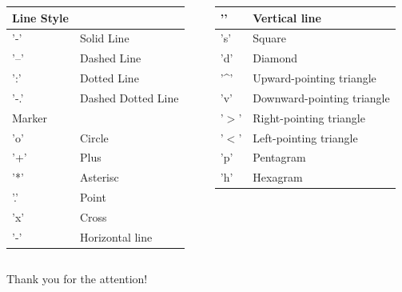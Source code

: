 \documentclass[xcolor={dvipsnames,rgb}, aspectratio=169]{beamer}
\begin{document}
\begin{frame}{}
   \begin{columns}[t]
      \begin{column}{0.5\textwidth}
         \begin{table}
         \centering
         \begin{tabular}{l|l} 
         \hline
         \multicolumn{1}{l}{Line Style} & \\
         \hline
         '-'    & Solid Line \\
         \hline
         '--'   & Dashed Line \\
         \hline
         ':'    & Dotted Line \\
         \hline
         '-.'   & Dashed Dotted Line \\
         \hline\hline
         \multicolumn{1}{l}{Marker} & \\
         \hline\hline
         'o'     & Circle \\
         \hline
         '+'     & Plus \\
         \hline
         '*'     & Asterisc \\
         \hline
         '.'     & Point \\
         \hline
         'x'     & Cross \\
         \hline
         '-'     & Horizontal line \\
         \hline
         \end{tabular}
         \end{table}
      \end{column}
      \begin{column}{0.5\textwidth}
         \begin{table}
         \centering
         \begin{tabular}{l|l} 
         \hline
         '\textbar{}' & Vertical line \\
         \hline
         's'  & Square \\
         \hline
         'd' & Diamond \\
         \hline
         '\^{}'    & Upward-pointing triangle \\
         \hline
         'v'       & Downward-pointing triangle \\
         \hline
         '$>$' & Right-pointing triangle \\
         \hline
         '$<$' & Left-pointing triangle \\
         \hline
         'p' & Pentagram \\
         \hline
         'h'  & Hexagram \\
         \hline
         \end{tabular}
         \end{table}
      \end{column}
   \end{columns}
\end{frame}


{%
   \begin{frame}[standout]
      Thank you for the attention!
   \end{frame}
}

\end{document}
